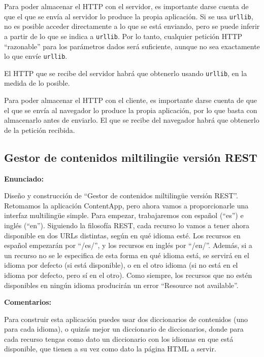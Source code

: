 Para poder almacenar el HTTP con el servidor, es importante darse cuenta de que el que se envía al servidor lo produce la propia aplicación. Si se usa \texttt{urllib}, no es posible acceder directamente a lo que se está enviando, pero se puede inferir a partir de lo que se indica a \texttt{urllib}. Por lo tanto, cualquier petición HTTP ``razonable'' para los parámetros dados será suficiente, aunque no sea exactamente lo que envíe \texttt{urllib}.

El HTTP que se recibe del servidor habrá que obtenerlo usando \texttt{urllib}, en la medida de lo posible.

Para poder almacenar el HTTP con el cliente, es importante darse cuenta de que el que se envía al navegador lo produce la propia aplicación, por lo que basta con almacenarlo antes de enviarlo. El que se recibe del navegador habrá que obtenerlo de la petición recibida.

\subsection{Gestor de contenidos miltilingüe versión REST}
\label{subsec:contentappmulti}

\textbf{Enunciado:}

Diseño y construcción de ``Gestor de contenidos miltilingüe versión REST''. Retomamos la aplicación ContentApp, pero ahora vamos a proporcionarle una interfaz multilingüe simple. Para empezar, trabajaremos con español (``es'') e inglés (``en''). Siguiendo la filosofía REST, cada recurso lo vamos a tener ahora disponible en dos URLs distintas, según en qué idioma esté. Los recursos en español empezarán por ``/es/'', y los recursos en inglés por ``/en/''. Además, si a un recurso no se le especifica de esta forma en qué idioma está, se servirá en el idioma por defecto (si está disponible), o en el otro idioma (si no está en el idioma por defecto, pero sí en el otro). Como siempre, los recursos que no estén disponibles en ningún idioma producirán un error ``Resource not available''.

\textbf{Comentarios:}

Para construir esta aplicación puedes usar dos diccionarios de contenidos (uno para cada idioma), o quizás mejor un diccionario de diccionarios, donde para cada recurso tengas como dato un diccionario con los idiomas en que está disponible, que tienen a su vez como dato la página HTML a servir.


